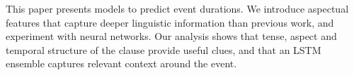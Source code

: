 This paper presents models to predict event durations. We introduce aspectual features that capture deeper linguistic information than previous work, and experiment with neural networks. Our analysis shows that tense, aspect and temporal structure of the clause provide useful clues, and that an LSTM ensemble captures relevant context around the event.
